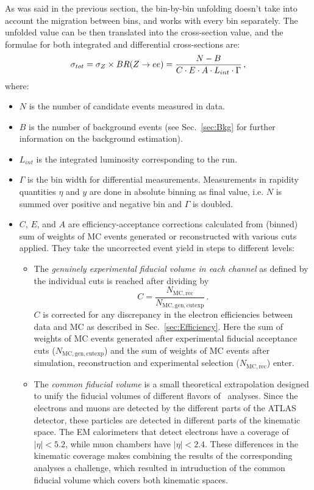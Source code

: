 As was said in the previous section, the bin-by-bin unfolding doesn't take into account the migration between bins, and works with every bin separately. The unfolded value can be then translated into the cross-section value, and the formulae for both integrated and differential cross-sections are:
\begin{equation}
\sigma_{tot} = \sigma_{Z} \times BR(Z \rightarrow ee) = \frac{N - B}{C \cdot E \cdot A \cdot L_{int}  \cdot \Gamma}\,,
\end{equation}
where:
\begin{itemize}
\item {\bfseries $N$} is the number of candidate events measured in data.
\item {\bfseries $B$} is the number of background events (see Sec.~\ref{sec:Bkg} for further information on the background estimation).
\item {\bfseries $L_{int}$} is the integrated luminosity corresponding to the run.
\item {\bfseries $\Gamma$} is the bin width for differential measurements. Measurements in rapidity quantities $\eta$ and $y$ are done in absolute binning as final value, i.e. $N$ is summed over positive and negative bin and $\Gamma$ is doubled.
\item $C$, $E$, and $A$ are efficiency-acceptance corrections calculated from (binned) sum of weights of MC events generated or reconstructed with various cuts applied. They take the uncorrected event yield in steps to different levels:
  \begin{itemize}
  \item The \textit{genuinely experimental fiducial volume in each channel} as defined by the individual cuts is reached after dividing by
    \begin{equation}
      C = \frac{N_\mathrm{MC, rec}}{N_\mathrm{MC, gen, cutexp}}\,.
    \end{equation}
    $C$ is corrected for any discrepancy in the electron efficiencies between data and MC as described in Sec.~\ref{sec:Efficiency}. Here the sum of weights of MC events generated after experimental fiducial acceptance cuts ($N_\mathrm{MC, gen, cutexp}$) and the sum of weights of MC events after simulation, reconstruction and experimental selection ($N_\mathrm{MC, rec}$) enter.
  \item The \textit{common fiducial volume} is a small theoretical extrapolation designed to unify the fiducial volumes of different flavors of \Zll\ analyses. Since the electrons and muons are detected by the different parts of the ATLAS detector, these particles are detected in different parts of the kinematic space. The EM calorimeters that detect electrons have a coverage of $|\eta| < 5.2$, while muon chambers have $|\eta| < 2.4$. These differences in the kinematic coverage makes combining the results of the corresponding analyses a challenge, which resulted in intruduction of the common fiducial volume which covers both kinematic spaces.

\end{itemize}
\end{itemize}

